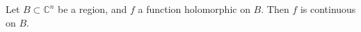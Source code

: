 Let $B \subset \mathbb{C}^n$ be a region, and $f$ a function holomorphic on $B$. Then $f$ is continuous on $B$.
